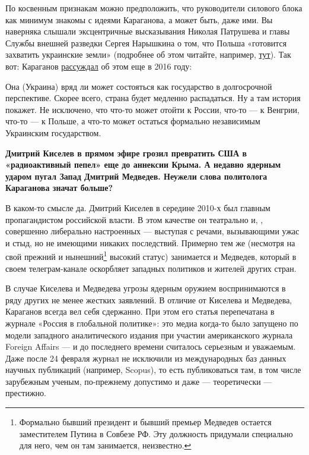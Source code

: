 По косвенным признакам можно предположить, что руководители силового блока как минимум знакомы с идеями Караганова, а может быть, даже  ими. Вы наверняка слышали эксцентричные высказывания Николая Патрушева и главы Службы внешней разведки Сергея Нарышкина о том, что Польша «готовится захватить украинские земли» (подробнее об этом читайте, например, \href{https://carnegieendowment.org/politika/88530}{тут}). Так вот: Караганов \href{https://globalaffairs.ru/articles/rakety-v-evrope-vospominaniya-o-budushhem/}{рассуждал} об этом еще в 2016 году:

\begin{fancyquotes}
    Она (Украина) вряд ли может состояться как государство в долгосрочной перспективе. Скорее всего, страна будет медленно распадаться. Ну а там история покажет. Не исключено, что что-то может отойти к России, что-то — к Венгрии, что-то — к Польше, а что-то может остаться формально независимым Украинским государством.
\end{fancyquotes}

\textbf{Дмитрий Киселев в прямом эфире грозил превратить США в «радиоактивный пепел» еще до аннексии Крыма. А недавно ядерным ударом пугал Запад Дмитрий Медведев. Неужели слова политолога Караганова значат больше?}

В каком-то смысле да. Дмитрий Киселев в середине 2010-х был главным пропагандистом российской власти. В этом качестве он театрально и, , совершенно   либерально настроенных  --- выступая с речами, вызывающими ужас и стыд, но не имеющими никаких последствий. Примерно тем же (несмотря на свой прежний и нынешний\footnote{Формально бывший президент и бывший премьер Медведев остается заместителем Путина в Совбезе РФ. Эту должность придумали специально для него, чем он там занимается, неизвестно.} высокий статус) занимается и Медведев, который в своем телеграм-канале оскорбляет западных политиков и жителей других стран.

В случае Киселева и Медведева угрозы ядерным оружием воспринимаются в ряду других не менее жестких заявлений. В отличие от Киселева и Медведева, Караганов всегда вел себя сдержанно. При этом его статья перепечатана в журнале «Россия в глобальной политике»: это медиа когда-то было запущено по модели западного аналитического издания при участии американского журнала Foreign Affairs — и до последнего времени считалось серьезным и уважаемым. Даже после 24 февраля журнал не исключили из международных баз данных научных публикаций (например, Scopus), то есть публиковаться там, в том числе зарубежным ученым, по-прежнему допустимо и даже — теоретически — престижно.

